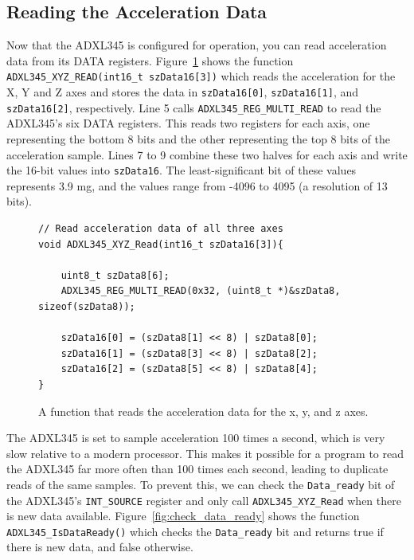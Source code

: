 \documentclass[11pt, twoside, pdftex]{article}
\begin{document}
\subsection{Reading the Acceleration Data}

Now that the ADXL345 is configured for operation, you can read acceleration data from its DATA registers. Figure~\ref{fig:read_accel_data} shows the function \texttt{ADXL345\_XYZ\_READ(int16\_t szData16[3])} which reads the acceleration for the X, Y and Z axes and stores the data in \texttt{szData16[0]}, \texttt{szData16[1]}, and \texttt{szData16[2]}, respectively. Line 5 calls \texttt{ADXL345\_REG\_MULTI\_READ} to read the ADXL345's six DATA registers. This reads two registers for each axis, one representing the bottom 8 bits and the other representing the top 8 bits of the acceleration sample. Lines 7 to 9 combine these two halves for each axis and write the 16-bit values into \texttt{szData16}. The least-significant bit of these values represents 3.9 mg, and the values range from -4096 to 4095 (a resolution of 13 bits). %

\begin{figure}[H]
\begin{center}
\begin{minipage}[t]{16 cm}
\begin{lstlisting}
// Read acceleration data of all three axes
void ADXL345_XYZ_Read(int16_t szData16[3]){

    uint8_t szData8[6];
    ADXL345_REG_MULTI_READ(0x32, (uint8_t *)&szData8, sizeof(szData8));
    
    szData16[0] = (szData8[1] << 8) | szData8[0]; 
    szData16[1] = (szData8[3] << 8) | szData8[2];
    szData16[2] = (szData8[5] << 8) | szData8[4];
}
\end{lstlisting}
\end{minipage}
\end{center}
\vspace{-0.33in}\caption{A function that reads the acceleration data for the x, y, and z axes.}
\label{fig:read_accel_data}
\end{figure}

The ADXL345 is set to sample acceleration 100 times a second, which is very slow relative to a modern processor. This makes it possible for a program to read the ADXL345 far more often than 100 times each second, leading to duplicate reads of the same samples. To prevent this, we can check the \texttt{Data\_ready} bit of the ADXL345's \texttt{INT\_SOURCE} register and only call \texttt{ADXL345\_XYZ\_Read} when there is new data available. Figure~\ref{fig:check_data_ready} shows the function \texttt{ADXL345\_IsDataReady()} which checks the \texttt{Data\_ready} bit and returns true if there is new data, and false otherwise.
\end{document}
